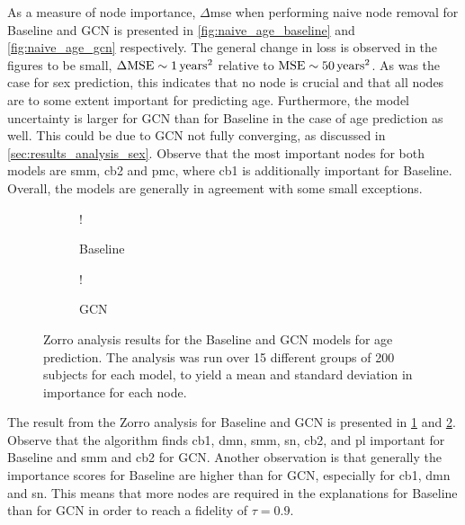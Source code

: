 As a measure of node importance, $\Delta$\acrshort{mse} when performing naive node removal for Baseline and GCN is presented in \cref{fig:naive_age_baseline} and \cref{fig:naive_age_gcn} respectively. The general change in loss is observed in the figures to be small, $\Delta\text{MSE}\sim1\rm\,years^2$ relative to $\text{MSE}\sim50\rm\,years^2$. As was the case for sex prediction, this indicates that no node is crucial and that all nodes are to some extent important for predicting age. Furthermore, the model uncertainty is larger for GCN than for Baseline in the case of age prediction as well. This could be due to GCN not fully converging, as discussed in \cref{sec:results_analysis_sex}. Observe that the most important nodes for both models are \acrshort{smm}, \acrshort{cb2} and \acrshort{pmc}, where \acrshort{cb1} is additionally important for Baseline. Overall, the models are generally in agreement with some small exceptions. 

\begin{figure}[!htbp]
    \centering
        \begin{subfigure}{.5\textwidth}
            \centering
            \begin{center}
                \resizebox {1.0\linewidth} {!} {
                    
                }
            \end{center}
            \caption{Baseline}
            \label{fig:zorro_age_baseline}
        \end{subfigure}%
        \begin{subfigure}{.5\textwidth}
            \centering
            \begin{center}
                \resizebox {1.0\linewidth} {!} {
                    
                }
            \end{center}
            \caption{GCN}
            \label{fig:zorro_age_gcn}
        \end{subfigure}
    \caption{Zorro analysis results for the Baseline and GCN models for age prediction. The analysis was run over 15 different groups of 200 subjects for each model, to yield a mean and standard deviation in importance for each node.}
    \label{fig:zorro_age}
\end{figure}

The result from the Zorro analysis for Baseline and GCN is presented in \cref{fig:zorro_age_baseline} and \cref{fig:zorro_age_gcn}. Observe that the algorithm finds \acrshort{cb1}, \acrshort{dmn}, \acrshort{smm}, \acrshort{sn}, \acrshort{cb2}, and \acrshort{pl} important for Baseline and \acrshort{smm} and \acrshort{cb2} for GCN. Another observation is that generally the importance scores for Baseline are higher than for GCN, especially for \acrshort{cb1}, \acrshort{dmn} and \acrshort{sn}. This means that more nodes are required in the explanations for Baseline than for GCN in order to reach a fidelity of $\tau=0.9$.

